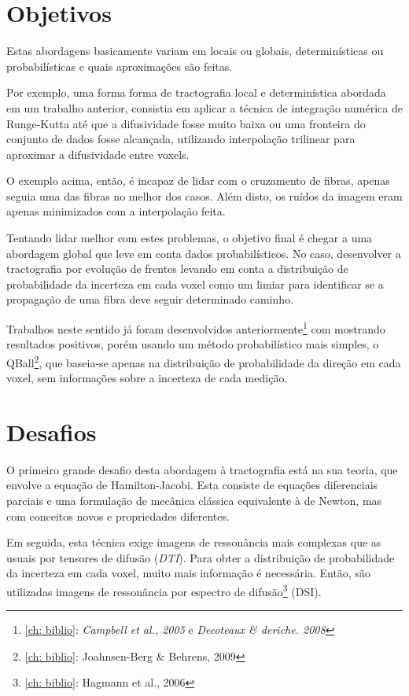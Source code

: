 \documentclass[a4paper,11pt]{report}
\begin{document}
  \section{Objetivos}
  Estas abordagens basicamente variam em locais ou globais, determinísticas ou probabilísticas e quais aproximações são feitas. 
  
  Por exemplo, uma forma forma de tractografia local e determinística abordada em um trabalho anterior, consistia em aplicar a técnica de integração numérica de Runge-Kutta até que a difusividade fosse muito baixa ou uma fronteira do conjunto de dados fosse alcançada, utilizando interpolação trilinear para aproximar a difusividade entre voxels.
  
  O exemplo acima, então, é incapaz de lidar com o cruzamento de fibras, apenas seguia uma das fibras no melhor dos casos. Além disto, os ruídos da imagem eram apenas minimizados com a interpolação feita.
  
  Tentando lidar melhor com estes problemas, o objetivo final é chegar a uma abordagem global que leve em conta dados probabilísticos. No caso, desenvolver a tractografia por evolução de frentes levando em conta a distribuição de probabilidade da incerteza em cada voxel como um limiar para identificar se a propagação de uma fibra deve seguir determinado caminho.

  Trabalhos neste sentido já foram desenvolvidos anteriormente\footnote{\ref{ch: biblio}: \textit{Campbell et al., 2005} e \textit{Decoteaux \& deriche. 2008}} com mostrando resultados positivos, porém usando um método probabilístico mais simples, o QBall\footnote{\ref{ch: biblio}: Joahnsen-Berg \& Behrens, 2009}, que baseia-se apenas na distribuição de probabilidade da direção em cada voxel, sem informações sobre a incerteza de cada medição.
  
  \section{Desafios}
  O primeiro grande desafio desta abordagem à tractografia está na sua teoria, que envolve a equação de Hamilton-Jacobi. Esta consiste de equações diferenciais parciais e uma formulação de mecânica clássica equivalente à de Newton, mas com conceitos novos e propriedades diferentes.
  
  Em seguida, esta técnica exige imagens de ressonância mais complexas que as usuais por tensores de difusão (\textit{DTI}). Para obter a distribuição de probabilidade da incerteza em cada voxel, muito mais informação é necessária. Então, são utilizadas imagens de ressonância por espectro de difusão\footnote{\ref{ch: biblio}: Hagmann et al., 2006} (DSI).
  
\end{document}
